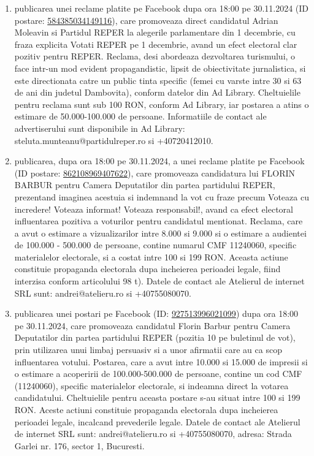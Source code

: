 \documentclass[a4paper,12pt]{article}
\begin{document}
\begin{enumerate}[leftmargin=*, label=\arabic*.)]
    \item publicarea unei reclame platite pe Facebook dupa ora 18:00 pe 30.11.2024 (ID postare: \href{https://www.facebook.com/ads/library/?id=584385034149116}{584385034149116}), care promoveaza direct candidatul Adrian Moleavin si Partidul REPER la alegerile parlamentare din 1 decembrie, cu fraza explicita Votati REPER pe 1 decembrie, avand un efect electoral clar pozitiv pentru REPER.  Reclama, desi abordeaza dezvoltarea turismului, o face intr-un mod evident propagandistic, lipsit de obiectivitate jurnalistica, si este directionata catre un public tinta specific (femei cu varste intre 30 si 63 de ani din judetul Dambovita), conform datelor din Ad Library.  Cheltuielile pentru reclama sunt sub 100 RON, conform Ad Library, iar postarea a atins o estimare de 50.000-100.000 de persoane.  Informatiile de contact ale advertiserului sunt disponibile in Ad Library: steluta.munteanu@partidulreper.ro si +40720412010.
    \item publicarea, dupa ora 18:00 pe 30.11.2024, a unei reclame platite pe Facebook (ID postare: \href{https://www.facebook.com/ads/library/?id=862108969407622}{862108969407622}), care promoveaza candidatura lui FLORIN BARBUR pentru Camera Deputatilor din partea partidului REPER, prezentand imaginea acestuia si indemnand la vot cu fraze precum Voteaza cu incredere! Voteaza informat! Voteaza responsabil!, avand ca efect electoral influentarea pozitiva a voturilor pentru candidatul mentionat.  Reclama, care a avut o estimare a vizualizarilor intre 8.000 si 9.000 si o estimare a audientei de 100.000 - 500.000 de persoane, contine numarul CMF 11240060, specific materialelor electorale, si a costat intre 100 si 199 RON.  Aceasta actiune constituie propaganda electorala dupa incheierea perioadei legale, fiind interzisa conform articolului 98 t).  Datele de contact ale Atelierul de internet SRL sunt: andrei@atelieru.ro si +40755080070.
    \item publicarea unei postari pe Facebook (ID: \href{https://www.facebook.com/ads/library/?id=927513996021099}{927513996021099}) dupa ora 18:00 pe 30.11.2024, care promoveaza candidatul Florin Barbur pentru Camera Deputatilor din partea partidului REPER (pozitia 10 pe buletinul de vot),  prin utilizarea unui limbaj persuasiv si a unor afirmatii care au ca scop influentarea votului. Postarea, care a avut intre 10.000 si 15.000 de impresii si o estimare a acoperirii de 100.000-500.000 de persoane, contine un cod CMF (11240060), specific materialelor electorale, si indeamna direct la votarea candidatului.  Cheltuielile pentru aceasta postare s-au situat intre 100 si 199 RON.  Aceste actiuni constituie propaganda electorala dupa incheierea perioadei legale, incalcand prevederile legale.  Datele de contact ale Atelierul de internet SRL sunt: andrei@atelieru.ro si +40755080070, adresa: Strada Garlei nr. 176, sector 1, Bucuresti.

\end{enumerate}
\end{document}
